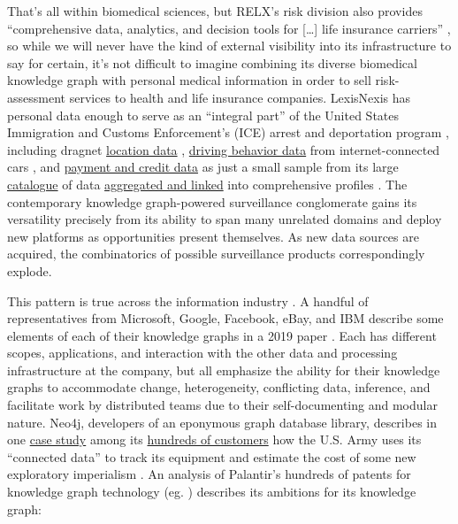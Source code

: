 \documentclass{article}
\begin{document}
That's all within biomedical sciences, but RELX's risk division also
provides ``comprehensive data, analytics, and decision tools for
{[}\ldots{]} life insurance carriers'' \cite{relxAnnualReport20222023} , so while we will never have the kind of
external visibility into its infrastructure to say for certain, it's not
difficult to imagine combining its diverse biomedical knowledge graph
with personal medical information in order to sell risk-assessment
services to health and life insurance companies. LexisNexis has personal
data enough to serve as an ``integral part'' of the United States
Immigration and Customs Enforcement's (ICE) arrest and deportation
program \cite{biddleLexisNexisProvideGiant2021, biddleICESearchedLexisNexis2022} , including dragnet
\href{https://web.archive.org/web/20230308034123/https://risk.lexisnexis.com/products/accurint-trax}{location
data} \cite{lexisnexisrisksolutionsAccurintTraX} ,
\href{https://risk.lexisnexis.com/products/telematics-ondemand}{driving
behavior data} from internet-connected cars \cite{lexisnexisrisksolutionsTelematicsOnDemand} , and
\href{https://risk.lexisnexis.com/products/threatmetrix}{payment and
credit data} as just a small sample from its large
\href{https://web.archive.org/web/20230308034302/https://www.lexisnexis.com/pdf/AccurintForLegalProfessionals/24.pdf}{catalogue}
\cite{lexisnexisrisksolutionsAccurintLegalProfessionals2022}  of
data \href{https://risk.lexisnexis.com/our-technology/lexid}{aggregated
and linked} into comprehensive profiles \cite{lexisnexisrisksolutionsLexID} . The contemporary knowledge
graph-powered surveillance conglomerate gains its versatility precisely
from its ability to span many unrelated domains and deploy new platforms
as opportunities present themselves. As new data sources are acquired,
the combinatorics of possible surveillance products correspondingly
explode.

This pattern is true across the information industry \cite{sequedaDesigningBuildingEnterprise2021} . A handful of
representatives from Microsoft, Google, Facebook, eBay, and IBM describe
some elements of each of their knowledge graphs in a 2019 paper \cite{noyIndustryscaleKnowledgeGraphs2019} . Each has different
scopes, applications, and interaction with the other data and processing
infrastructure at the company, but all emphasize the ability for their
knowledge graphs to accommodate change, heterogeneity, conflicting data,
inference, and facilitate work by distributed teams due to their
self-documenting and modular nature. Neo4j, developers of an eponymous
graph database library, describes in one
\href{https://neo4j.com/case-studies/us-army/}{case study} among its
\href{https://neo4j.com/customers/}{hundreds of customers} how the U.S.
Army uses its ``connected data'' to track its equipment and estimate the
cost of some new exploratory imperialism \cite{neo4jNeo4jArmyCase2021} . An analysis of Palantir's hundreds of
patents for knowledge graph technology (eg. \cite{cohenSystemMethodSharing2015, mathuraAutomatedDatabaseAnalysis2017, yousafSystemsMethodsUser2018, knudsonSystemsMethodsAnnotating2021} )
describes its ambitions for its knowledge graph:
\end{document}
